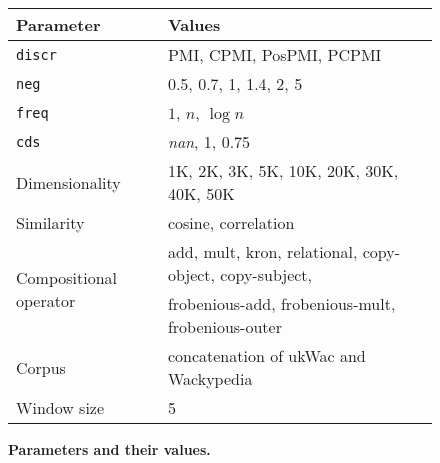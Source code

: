 \documentclass[11pt,letterpaper]{article}
\begin{document}
\begin{figure*}[th]
  \centering
  \begin{tabular}{llr}
    \toprule
    Parameter & Values \\
    \midrule
    \texttt{discr} & PMI, CPMI, PosPMI, PCPMI \\
    \texttt{neg} & 0.5, 0.7, 1, 1.4, 2, 5 \\
    \texttt{freq} & $1$, $n$, $\log n$ \\
    \texttt{cds} & \textit{nan}, 1, 0.75 \\
    Dimensionality & 1K, 2K, 3K, 5K, 10K, 20K, 30K, 40K, 50K \\
    Similarity & cosine, correlation \\
    \multirow{2}{*}{Compositional operator}
              & add, mult, kron, relational,
                copy-object, copy-subject, \\
              & frobenious-add, frobenious-mult,
                frobenious-outer
    \\
    Corpus & concatenation of ukWac and Wackypedia \\
    Window size & 5 \\
    \bottomrule
  \end{tabular}
  \caption{\textbf{Parameters and their values.}}
\end{figure*}

%

% 
\balance

\end{document}
